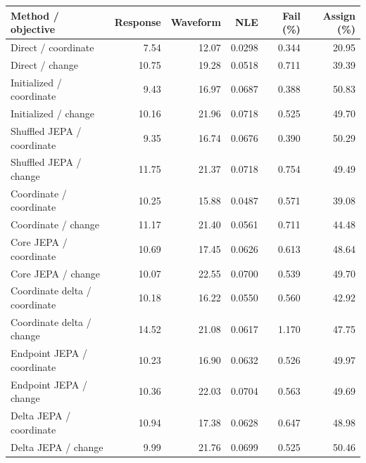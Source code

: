 \begin{tabular}{lrrrrr}\toprule
Method / objective & Response & Waveform & NLE & Fail (\%) & Assign (\%)\\\midrule
Direct / coordinate & 7.54 & 12.07 & 0.0298 & 0.344 & 20.95 \\
Direct / change & 10.75 & 19.28 & 0.0518 & 0.711 & 39.39 \\
Initialized / coordinate & 9.43 & 16.97 & 0.0687 & 0.388 & 50.83 \\
Initialized / change & 10.16 & 21.96 & 0.0718 & 0.525 & 49.70 \\
Shuffled JEPA / coordinate & 9.35 & 16.74 & 0.0676 & 0.390 & 50.29 \\
Shuffled JEPA / change & 11.75 & 21.37 & 0.0718 & 0.754 & 49.49 \\
Coordinate / coordinate & 10.25 & 15.88 & 0.0487 & 0.571 & 39.08 \\
Coordinate / change & 11.17 & 21.40 & 0.0561 & 0.711 & 44.48 \\
Core JEPA / coordinate & 10.69 & 17.45 & 0.0626 & 0.613 & 48.64 \\
Core JEPA / change & 10.07 & 22.55 & 0.0700 & 0.539 & 49.70 \\
Coordinate delta / coordinate & 10.18 & 16.22 & 0.0550 & 0.560 & 42.92 \\
Coordinate delta / change & 14.52 & 21.08 & 0.0617 & 1.170 & 47.75 \\
Endpoint JEPA / coordinate & 10.23 & 16.90 & 0.0632 & 0.526 & 49.97 \\
Endpoint JEPA / change & 10.36 & 22.03 & 0.0704 & 0.563 & 49.69 \\
Delta JEPA / coordinate & 10.94 & 17.38 & 0.0628 & 0.647 & 48.98 \\
Delta JEPA / change & 9.99 & 21.76 & 0.0699 & 0.525 & 50.46 \\
\bottomrule\end{tabular}
